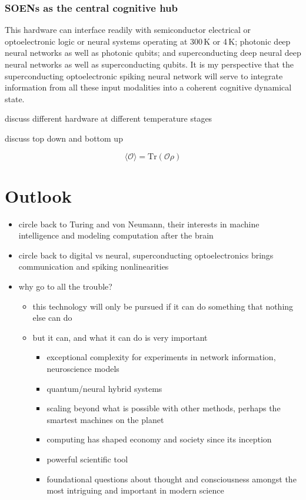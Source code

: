 \documentclass[twocolumn]{article}
\begin{document}
\subsubsection{SOENs as the central cognitive hub}
This hardware can interface readily with semiconductor electrical or optoelectronic logic or neural systems operating at 300\,K or 4\,K; photonic deep neural networks as well as photonic qubits; and superconducting deep neural deep neural networks as well as superconducting qubits. It is my perspective that the superconducting optoelectronic spiking neural network will serve to integrate information from all these input modalities into a coherent cognitive dynamical state. 

\vspace{3em}
discuss different hardware at different temperature stages

\vspace{3em}
discuss top down and bottom up

\begin{equation}
\label{eq:density_matrix}
\langle \mathcal{O}\rangle = \mathrm{Tr}(\mathcal{O}\rho)
\end{equation}


\section{\label{sec:outlook}Outlook}

\begin{itemize}

\item circle back to Turing and von Neumann, their interests in machine intelligence and modeling computation after the brain
\item circle back to digital vs neural, superconducting optoelectronics brings communication and spiking nonlinearities

\item why go to all the trouble?
\begin{itemize}
\item this technology will only be pursued if it can do something that nothing else can do
\item but it can, and what it can do is very important
\begin{itemize}
\item exceptional complexity for experiments in network information, neuroscience models
\item quantum/neural hybrid systems
\item scaling beyond what is possible with other methods, perhaps the smartest machines on the planet
\item computing has shaped economy and society since its inception
\item powerful scientific tool
\item foundational questions about thought and consciousness amongst the most intriguing and important in modern science
\end{itemize}

\end{itemize}

\end{itemize}
\end{document}
